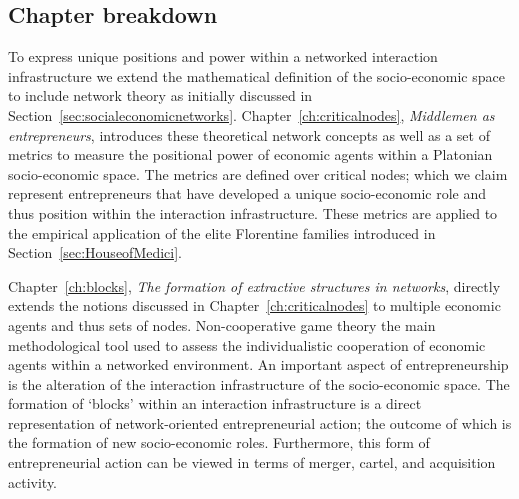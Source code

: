 \subsection*{Chapter breakdown}

To express unique positions and power within a networked interaction infrastructure we extend the mathematical definition of the socio-economic space to include network theory as initially discussed in Section~\ref{sec:socialeconomicnetworks}. Chapter~\ref{ch:criticalnodes}, \emph{Middlemen as entrepreneurs}, introduces these theoretical network concepts as well as a set of metrics to measure the positional power of economic agents within a Platonian socio-economic space. The metrics are defined over critical nodes; which we claim represent entrepreneurs that have developed a unique socio-economic role and thus position within the interaction infrastructure. These metrics are applied to the empirical application of the elite Florentine families introduced in Section~\ref{sec:HouseofMedici}.

Chapter~\ref{ch:blocks}, \emph{The formation of extractive structures in networks}, directly extends the notions discussed in Chapter~\ref{ch:criticalnodes} to multiple economic agents and thus sets of nodes. Non-cooperative game theory the main methodological tool used to assess the individualistic cooperation of economic agents within a networked environment. An important aspect of entrepreneurship is the alteration of the interaction infrastructure of the socio-economic space. The formation of `blocks' within an interaction infrastructure is a direct representation of network-oriented entrepreneurial action; the outcome of which is the formation of new socio-economic roles. Furthermore, this form of entrepreneurial action can be viewed in terms of merger, cartel, and acquisition activity.
